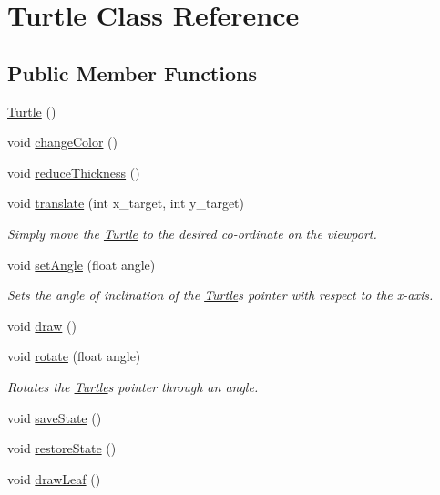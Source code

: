\hypertarget{classTurtle}{}\section{Turtle Class Reference}
\label{classTurtle}
\subsection*{Public Member Functions}
\begin{DoxyCompactItemize}
\item 
\hyperlink{classTurtle_a1610c37c2e750169f25b074e62db755d}{Turtle} ()
\item 
void \hyperlink{classTurtle_a3a785e57caf1d427656786278d3b0ba1}{change\+Color} ()
\item 
void \hyperlink{classTurtle_ab61cec4f4220126f3b45a1303c1f3b03}{reduce\+Thickness} ()
\item 
void \hyperlink{classTurtle_a1ac311827ae11900b6d0dd76304f72a5}{translate} (int x\+\_\+target, int y\+\_\+target)\hypertarget{classTurtle_a1ac311827ae11900b6d0dd76304f72a5}{}\label{classTurtle_a1ac311827ae11900b6d0dd76304f72a5}

\begin{DoxyCompactList}\small\item\em Simply move the \hyperlink{classTurtle}{Turtle} to the desired co-\/ordinate on the viewport. \end{DoxyCompactList}\item 
void \hyperlink{classTurtle_ace9c83560bdcb5c9480d017f000a724b}{set\+Angle} (float angle)\hypertarget{classTurtle_ace9c83560bdcb5c9480d017f000a724b}{}\label{classTurtle_ace9c83560bdcb5c9480d017f000a724b}

\begin{DoxyCompactList}\small\item\em Sets the angle of inclination of the \hyperlink{classTurtle}{Turtle}\textquotesingle{}s pointer with respect to the x-\/axis. \end{DoxyCompactList}\item 
void \hyperlink{classTurtle_a2461a61b2d42bca39c466e75af3cd4e3}{draw} ()
\item 
void \hyperlink{classTurtle_a4f667fe3bee778bb6d37071f0bcabd34}{rotate} (float angle)\hypertarget{classTurtle_a4f667fe3bee778bb6d37071f0bcabd34}{}\label{classTurtle_a4f667fe3bee778bb6d37071f0bcabd34}

\begin{DoxyCompactList}\small\item\em Rotates the \hyperlink{classTurtle}{Turtle}\textquotesingle{}s pointer through an angle. \end{DoxyCompactList}\item 
void \hyperlink{classTurtle_abfdb07aa29fc62888d3f28cc68c951f4}{save\+State} ()
\item 
void \hyperlink{classTurtle_ad96aa7929b2421e3b30ebb76b2295880}{restore\+State} ()
\item 
void \hyperlink{classTurtle_abac9a4338af2d7ad1248f067135f992a}{draw\+Leaf} ()
\end{DoxyCompactItemize}


